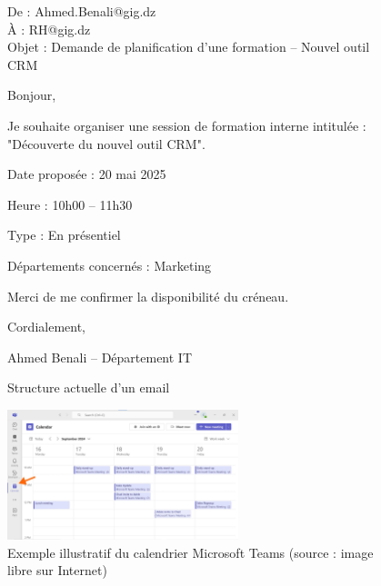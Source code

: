 \documentclass{article}
\begin{document}
\hspace{1cm}

\begin{figure}[h!]
  \centering
  \begin{tcolorbox}[title=Simulation d’un e-mail de demande de formation]

De : Ahmed.Benali@gig.dz \\
À : RH@gig.dz \\
Objet : Demande de planification d'une formation – Nouvel outil CRM

Bonjour,

Je souhaite organiser une session de formation interne intitulée : "Découverte du nouvel outil CRM".

Date proposée : 20 mai 2025 

Heure : 10h00 – 11h30  

Type : En présentiel  

Départements concernés : Marketing 

Merci de me confirmer la disponibilité du créneau.

\vspace{0,3cm}

Cordialement,  

Ahmed Benali – Département IT
\end{tcolorbox}
  \caption{Structure actuelle d'un email}
  \label{fig:teams2}
\end{figure}

\hspace*{1,5em}
\begin{figure}[h!]
  \centering
  \includegraphics[width=0.6\textwidth]{Teams-calendar.jpg}
  \caption{Exemple illustratif du calendrier Microsoft Teams (source : image libre sur Internet)}
  \label{fig:teamscalendar}
\end{figure}
\end{document}
